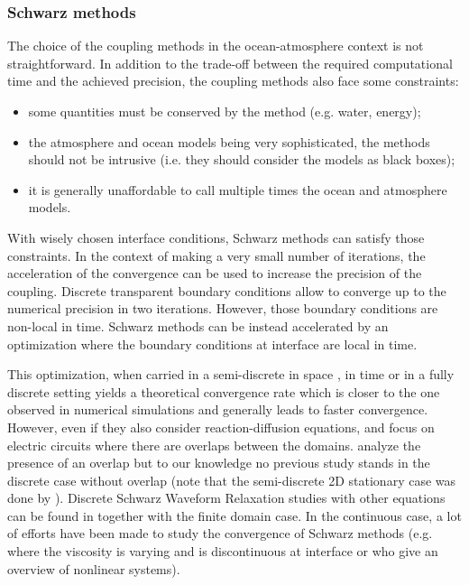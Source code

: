 \subsubsection*{Schwarz methods}
The choice of the coupling methods in the ocean-atmosphere context is
not straightforward.
In addition to the trade-off between the required computational time and
the achieved precision, the coupling methods
also face some constraints:
\begin{itemize}
	\item some quantities must be conserved by the method
		(e.g. water, energy);
	\item the atmosphere and ocean models being very
		sophisticated, the methods should not be intrusive
		(i.e. they should consider
		the models as black boxes);
	\item it is generally unaffordable to call multiple times
		the ocean and atmosphere models.
\end{itemize}
With wisely chosen interface conditions, Schwarz methods can
satisfy those constraints. In the context of making a very
small number of iterations, the acceleration of the convergence
can be used to increase the precision of the coupling.
Discrete transparent boundary conditions
\citep{zisowsky_discrete_2006} allow to converge up to the
numerical precision in two iterations.
However, those boundary conditions are non-local in time.
Schwarz methods can be instead accelerated
by an optimization \citep{gander_optimized_2006} where
the boundary conditions at interface are local in time.
\par
This optimization, when carried in a semi-discrete in space
\citep{wu_semi-discrete_2014-1},
in time \citep{arnoult_discrete-time_2022}
or in a fully discrete setting
\citep{wu_optimized_2017} yields a theoretical convergence rate which is
closer to the one observed in numerical simulations and
generally leads to faster convergence.
However, even if they also consider reaction-diffusion equations,
\citep{wu_semi-discrete_2014-1} and \citep{wu_optimized_2017}
focus on electric circuits where
there are overlaps between the domains. \citep{gander_analysis_2018}
analyze the presence of an overlap but to our knowledge no previous study
stands in the discrete case without overlap (note that the
semi-discrete 2D stationary case was done by
\citep{gerardo-giorda_optimized_2005}).
Discrete Schwarz Waveform Relaxation studies with other equations
can be found in \citep{haynes_fully_2020} together with
the finite domain case.
In the continuous case, a lot of efforts have been made
to study the convergence of Schwarz methods
(e.g. \citep{thery_analysis_2021} where the viscosity
is varying and is discontinuous at interface or
\citep{haberlein_optimized_2014} who give an overview of
nonlinear systems).
